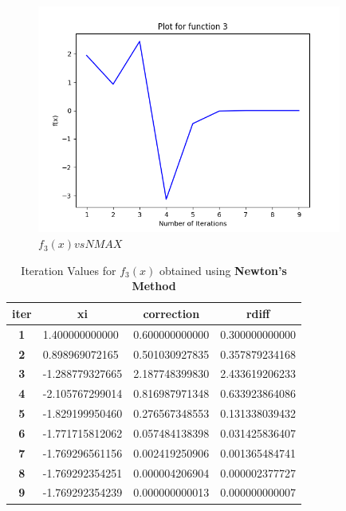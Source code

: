 \documentclass[a4paper, 12pt]{report}
\begin{document}
\begin{figure}[h]
    \centering
    \includegraphics[width=10cm]{NME.png}
    \caption{$f_{3}(x) vs NMAX$}
    \label{fig:NME}
    \end{figure}
   
\begin{table}[]
\centering
\begin{tabular}{|c|l|l|l|}
\hline
\textbf{iter} & \multicolumn{1}{c|}{\textbf{xi}} & \multicolumn{1}{c|}{\textbf{correction}} & \multicolumn{1}{c|}{\textbf{rdiff}} \\ \hline
\textbf{1} & 1.400000000000  & 0.600000000000 & 0.300000000000 \\ \hline
\textbf{2} & 0.898969072165  & 0.501030927835 & 0.357879234168 \\ \hline
\textbf{3} & -1.288779327665 & 2.187748399830 & 2.433619206233 \\ \hline
\textbf{4} & -2.105767299014 & 0.816987971348 & 0.633923864086 \\ \hline
\textbf{5} & -1.829199950460 & 0.276567348553 & 0.131338039432 \\ \hline
\textbf{6} & -1.771715812062 & 0.057484138398 & 0.031425836407 \\ \hline
\textbf{7} & -1.769296561156 & 0.002419250906 & 0.001365484741 \\ \hline
\textbf{8} & -1.769292354251 & 0.000004206904 & 0.000002377727 \\ \hline
\textbf{9} & -1.769292354239 & 0.000000000013 & 0.000000000007 \\ \hline
\end{tabular}
\caption{Iteration Values for $f_{3}(x)$ obtained using \textbf{Newton's Method}}
\label{table:NME}
\end{table}
\end{document}
